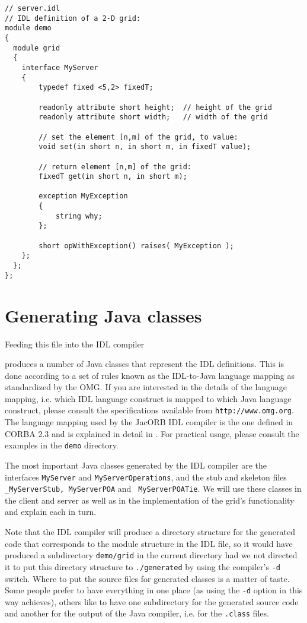 {\small
\begin{verbatim}
// server.idl
// IDL definition of a 2-D grid:
module demo
{
  module grid
  {
    interface MyServer
    {
        typedef fixed <5,2> fixedT;

        readonly attribute short height;  // height of the grid
        readonly attribute short width;   // width of the grid

        // set the element [n,m] of the grid, to value:
        void set(in short n, in short m, in fixedT value);

        // return element [n,m] of the grid:
        fixedT get(in short n, in short m);

        exception MyException
        {
            string why;
        };

        short opWithException() raises( MyException );
    };
  };
};
\end{verbatim}
}

\section{Generating Java classes}

Feeding this file into the IDL compiler


produces a number of Java classes that represent the IDL definitions.
This is done according to a set of rules known as the IDL-to-Java
language mapping as standardized by the OMG. If you are interested in
the details of the language mapping, i.e. which IDL language construct
is mapped to which Java language construct, please consult the
specifications available from {\tt http://www.omg.org}. The language mapping
used by the JacORB IDL compiler is the one defined in CORBA 2.3 and is
explained in detail in \cite{Brose2001a}. For practical usage, please
consult the examples in the {\tt demo} directory.

The most important Java classes generated by the IDL compiler are the
interfaces {\tt MyServer} and {\tt MyServerOperations}, and the stub
and skeleton files {\tt \_MyServerStub, MyServerPOA} and {\tt
  MyServerPOATie}.  We will use these classes in the client and server
as well as in the implementation of the grid's functionality and
explain each in turn.

Note that the IDL compiler will produce a directory structure for the
generated code that corresponds to the module structure in the IDL
file, so it would have produced a subdirectory {\tt demo/grid} in the
current directory had we not directed it to put this directory
structure to {\tt ./generated} by using the compiler's {\tt -d} switch.
  Where to put the source files for generated classes is a matter of
  taste.  Some people prefer to have everything in one place (as using
  the {\tt -d} option in this way achieves), others like to have one
  subdirectory for the generated source code and another for the
  output of the Java compiler, i.e. for the {\tt .class} files.



